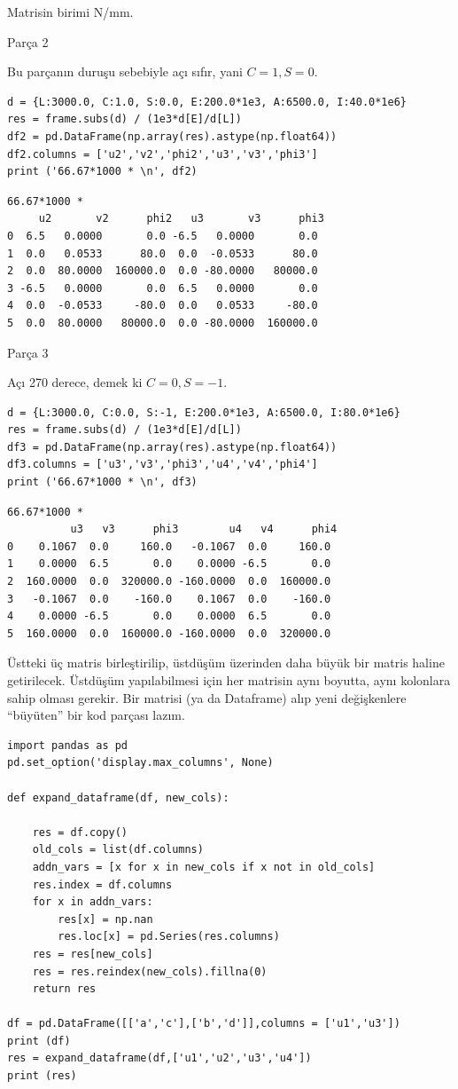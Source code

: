 \documentclass[12pt,fleqn]{article}\usepackage{../../common}
\begin{document}
Matrisin birimi N/mm. 

Parça 2

Bu parçanın duruşu sebebiyle açı sıfır, yani $C=1,S=0$.

\begin{verbatim}
d = {L:3000.0, C:1.0, S:0.0, E:200.0*1e3, A:6500.0, I:40.0*1e6}
res = frame.subs(d) / (1e3*d[E]/d[L])
df2 = pd.DataFrame(np.array(res).astype(np.float64))
df2.columns = ['u2','v2','phi2','u3','v3','phi3']
print ('66.67*1000 * \n', df2)
\end{verbatim}

\begin{verbatim}
66.67*1000 * 
     u2       v2      phi2   u3       v3      phi3
0  6.5   0.0000       0.0 -6.5   0.0000       0.0
1  0.0   0.0533      80.0  0.0  -0.0533      80.0
2  0.0  80.0000  160000.0  0.0 -80.0000   80000.0
3 -6.5   0.0000       0.0  6.5   0.0000       0.0
4  0.0  -0.0533     -80.0  0.0   0.0533     -80.0
5  0.0  80.0000   80000.0  0.0 -80.0000  160000.0
\end{verbatim}

Parça 3

Açı 270 derece, demek ki $C=0,S=-1$.

\begin{verbatim}
d = {L:3000.0, C:0.0, S:-1, E:200.0*1e3, A:6500.0, I:80.0*1e6}
res = frame.subs(d) / (1e3*d[E]/d[L])
df3 = pd.DataFrame(np.array(res).astype(np.float64))
df3.columns = ['u3','v3','phi3','u4','v4','phi4']
print ('66.67*1000 * \n', df3)
\end{verbatim}

\begin{verbatim}
66.67*1000 * 
          u3   v3      phi3        u4   v4      phi4
0    0.1067  0.0     160.0   -0.1067  0.0     160.0
1    0.0000  6.5       0.0    0.0000 -6.5       0.0
2  160.0000  0.0  320000.0 -160.0000  0.0  160000.0
3   -0.1067  0.0    -160.0    0.1067  0.0    -160.0
4    0.0000 -6.5       0.0    0.0000  6.5       0.0
5  160.0000  0.0  160000.0 -160.0000  0.0  320000.0
\end{verbatim}

Üstteki üç matris birleştirilip, üstdüşüm üzerinden daha büyük bir matris haline
getirilecek. Üstdüşüm yapılabilmesi için her matrisin aynı boyutta, aynı
kolonlara sahip olması gerekir. Bir matrisi (ya da Dataframe) alıp yeni
değişkenlere ``büyüten'' bir kod parçası lazım.

\begin{verbatim}
import pandas as pd
pd.set_option('display.max_columns', None)

def expand_dataframe(df, new_cols):

    res = df.copy()
    old_cols = list(df.columns)
    addn_vars = [x for x in new_cols if x not in old_cols]
    res.index = df.columns
    for x in addn_vars:
        res[x] = np.nan
        res.loc[x] = pd.Series(res.columns)
    res = res[new_cols]
    res = res.reindex(new_cols).fillna(0)
    return res

df = pd.DataFrame([['a','c'],['b','d']],columns = ['u1','u3'])
print (df)
res = expand_dataframe(df,['u1','u2','u3','u4'])
print (res)
\end{verbatim}
\end{document}
